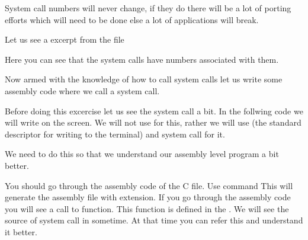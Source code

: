 \documentclass[letterpaper,10pt,english]{sphinxmanual}
\begin{document}
System call numbers will never change, if they do there will be a lot of
porting efforts which will need to be done else a lot of applications will
break.

Let us see a excerpt from the file 

\begin{sphinxVerbatim}[commandchars=\\\{\}]
\end{sphinxVerbatim}

Here you can see that the system calls have numbers associated with them.

Now armed with the knowledge of how to call system calls let us write some
assembly code where we call a system call.

Before doing this excercise let us see the  system call a bit. In the
follwing code we will write  on the screen. We will not use
 for this, rather we will use  (the standard descriptor for
writing to the terminal) and  system call for it.

We need to do this so that we understand our assembly level program a bit better.

\begin{sphinxVerbatim}[commandchars=\\\{\},numbers=left,firstnumber=1,stepnumber=1]
 

  
       
     
\end{sphinxVerbatim}

You should go through the assembly code of the C file. Use command  This will generate the assembly file with  extension. If you
go through the assembly code you will see a call to  function. This
function is defined in the . We will see the source of 
system call in sometime. At that time you can refer this and understand it
better.
\end{document}
